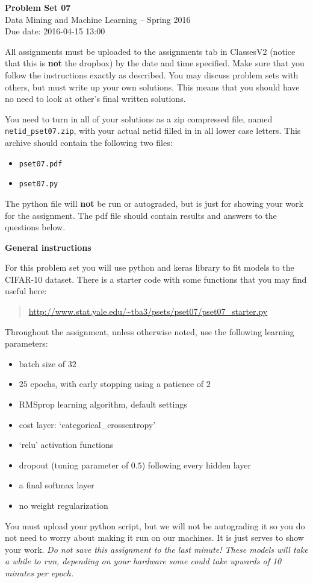 \documentclass[12pt]{article}
\begin{document}
\begin{center}
{\bf Problem Set 07} \\
Data Mining and Machine Learning -- Spring 2016 \\
Due date: 2016-04-15 13:00
\end{center}

\medskip

All assignments must be uploaded to the assignments tab in ClassesV2
(notice that this is \textbf{not} the dropbox) by the date and time specified.
Make sure that you follow the instructions exactly as described.
You may discuss problem sets with others, but must write up your own
solutions. This means that you should have no need to look at other's
final written solutions.

You need to turn in all of your solutions as a zip compressed file, named
\texttt{netid\_pset07.zip}, with your actual netid filled in in all lower
case letters. This archive should contain the following two files:
\begin{itemize}
\item \texttt{pset07.pdf}
\item \texttt{pset07.py}
\end{itemize}
The python file will \textbf{not} be run or autograded, but is just for
showing your work for the assignment. The pdf file should contain results and
answers to the questions below.

\medskip

\textbf{General instructions}

For this problem set you will use python and keras library to fit models
to the CIFAR-10 dataset.
There is a starter code with some functions that you may find useful here:
\begin{quote}
\url{http://www.stat.yale.edu/~tba3/psets/pset07/pset07_starter.py}
\end{quote}
Throughout the assignment, unless otherwise noted, use the following
learning parameters:
\begin{itemize}
\item batch size of $32$
\item $25$ epochs, with early stopping using a patience of $2$
\item RMSprop learning algorithm, default settings
\item cost layer: `categorical\_crossentropy'
\item `relu' activation functions
\item dropout (tuning parameter of $0.5$) following every hidden layer
\item a final softmax layer
\item no weight regularization
\end{itemize}
You must upload your python script, but we will not be autograding it so
you do not need to worry about making it run on our machines. It is just
serves to show your work. \textit{Do not save this assignment to the last
minute! These models will take a while to run, depending on your hardware
some could take upwards of 10 minutes per epoch.}
\end{document}
